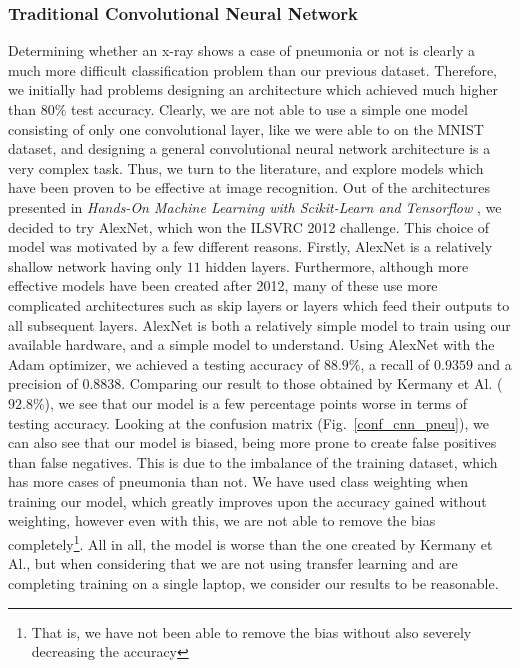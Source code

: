 \documentclass[onecolumn,10pt,cleanfoot]{asme2ej}
\begin{document}
\subsubsection{Traditional Convolutional Neural Network}

Determining whether an x-ray shows a case of pneumonia or not is clearly a much more difficult classification problem than our previous dataset. Therefore, we initially had problems designing an architecture which achieved much higher than $80\%$ test accuracy. Clearly, we are not able to use a simple one model consisting of only one convolutional layer, like we were able to on the MNIST dataset, and designing a general convolutional neural network architecture is a very complex task. Thus, we turn to the literature, and explore models which have been proven to be effective at image recognition. Out of the architectures presented in {\it Hands-On Machine Learning with Scikit-Learn and Tensorflow} \cite{geron}, we decided to try AlexNet, which won the ILSVRC 2012 challenge. This choice of model was motivated by a few different reasons. Firstly, AlexNet is a relatively shallow network having only $11$ hidden layers. Furthermore, although more effective models have been created after 2012, many of these use more complicated architectures such as skip layers or layers which feed their outputs to all subsequent layers. AlexNet is both a relatively simple model to train using our available hardware, and a simple model to understand. Using AlexNet with the Adam optimizer, we achieved a testing accuracy of $88.9\%$, a recall of $0.9359$ and a precision of $0.8838$. Comparing our result to those obtained by Kermany et Al. ($92.8\%$), we see that our model is a few percentage points worse in terms of testing accuracy. Looking at the confusion matrix (Fig.~\ref{conf_cnn_pneu}), we can also see that our model is biased, being more prone to create false positives than false negatives. This is due to the imbalance of the training dataset, which has more cases of pneumonia than not. We have used class weighting when training our model, which greatly improves upon the accuracy gained without weighting, however even with this, we are not able to remove the bias completely\footnote{That is, we have not been able to remove the bias without also severely decreasing the accuracy}. All in all, the model is worse than the one created by Kermany et Al., but when considering that we are not using transfer learning and are completing training on a single laptop, we consider our results to be reasonable.
\end{document}
